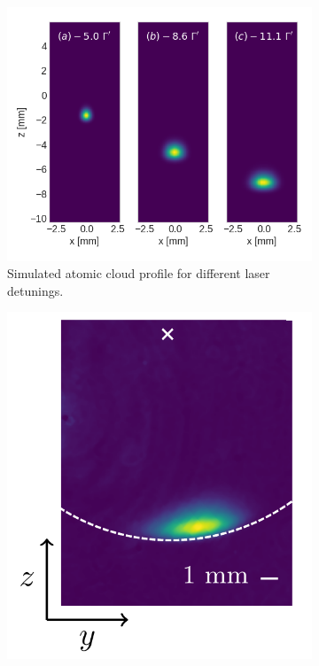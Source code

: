 \begin{figure}[!ht]
    \centering
    \caption{In-situ and simulated atomic cloud profile of Dreon nMOTs}
    \begin{subfigure}[b]{0.5\linewidth}
        \centering
        \includegraphics[width=\textwidth]{USPSC-img/dy_dreon_cloud_profile.png}
        \caption{Simulated atomic cloud profile for different laser detunings.}
        \label{fig:Dreon-simulated-atomic-cloud-profile}
    \end{subfigure}
    \hspace{20px}
    \begin{subfigure}[b]{0.3\linewidth}
        \centering
        \includegraphics[width=\textwidth]{USPSC-img/in-situ-atomic-cloud-Dreon.png}

\end{subfigure}
\end{figure}
